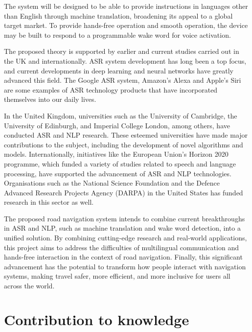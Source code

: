 \documentclass{epsrc}
\begin{document}
The system will be designed to be able to provide instructions in languages other than English through machine translation, broadening its appeal to a global target market. To provide hands-free operation and smooth operation, the device may be built to respond to a programmable wake word for voice activation.
\vspace{5pt}

The proposed theory is supported by earlier and current studies carried out in the UK and internationally. ASR system development has long been a top focus, and current developments in deep learning and neural networks have greatly advanced this field. The Google ASR system, Amazon’s Alexa and Apple's Siri are some examples of ASR technology products that have incorporated themselves into our daily lives.
\vspace{5pt}

In the United Kingdom, universities such as the University of Cambridge, the University of Edinburgh, and Imperial College London, among others, have conducted ASR and NLP research. These esteemed universities have made major contributions to the subject, including the development of novel algorithms and models. Internationally, initiatives like the European Union's Horizon 2020 programme, which funded a variety of studies related to speech and language processing, have supported the advancement of ASR and NLP technologies. Organisations such as the National Science Foundation and the Defence Advanced Research Projects Agency (DARPA) in the United States has funded research in this sector as well.
\vspace{5pt}

The proposed road navigation system intends to combine current breakthroughs in ASR and NLP, such as machine translation and wake word detection, into a unified solution. By combining cutting-edge research and real-world applications, this project aims to address the difficulties of multilingual communication and hands-free interaction in the context of road navigation. Finally, this significant advancement has the potential to transform how people interact with navigation systems, making travel safer, more efficient, and more inclusive for users all across the world. 

\part{Contribution to knowledge}
\vspace{5pt}
\end{document}

